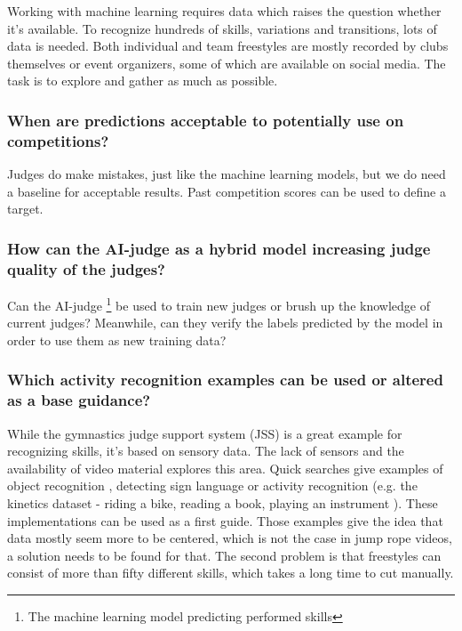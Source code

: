 Working with machine learning requires data which raises the question whether it's available. To recognize hundreds of skills, variations and transitions, lots of data is needed. Both individual and team freestyles are mostly recorded by clubs themselves or event organizers, some of which are available on social media. The task is to explore and gather as much as possible.

\subsubsection{When are predictions acceptable to potentially use on competitions?}
\label{subsubsec:intro-question-acceptable-results}

Judges do make mistakes, just like the machine learning models, but we do need a baseline for acceptable results. Past competition scores can be used to define a target.

\subsubsection{How can the AI-judge as a hybrid model increasing judge quality of the judges?}
\label{subsubsec:intro-question-hybrid-model-judge-quality}
Can the AI-judge \footnote{The machine learning model predicting performed skills} be used to train new judges or brush up the knowledge of current judges? Meanwhile, can they verify the labels predicted by the model in order to use them as new training data?

\subsubsection{Which activity recognition examples can be used or altered as a base guidance?}
\label{subsubsec:intro-question-earlier-research-guidance}

While the gymnastics judge support system (JSS) is a great example for recognizing skills, it's based on sensory data. The lack of sensors and the availability of video material explores this area.
Quick searches give examples of object recognition \autocite{Diwaker_2022}, detecting sign language \autocite{Bora_2023} or activity recognition (e.g. the kinetics dataset - riding a bike, reading a book, playing an instrument \autocite{Kay_2017}).
These implementations can be used as a first guide.
Those examples give the idea that data mostly seem more to be centered, which is not the case in jump rope videos, a solution needs to be found for that. The second problem is that freestyles can consist of more than fifty different skills, which takes a long time to cut manually.

